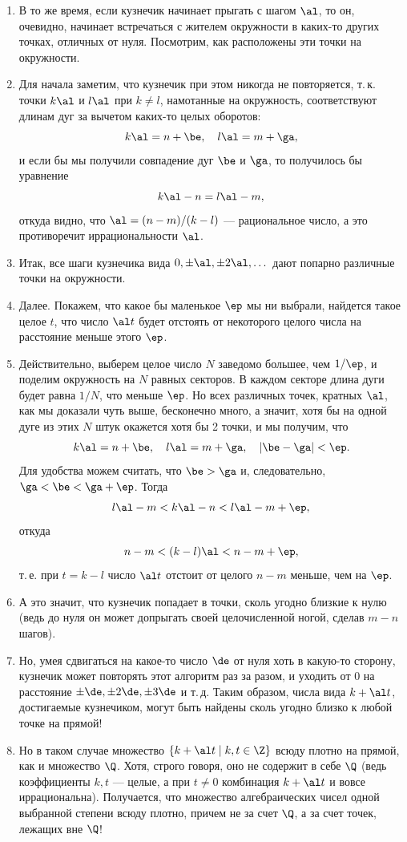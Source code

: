 \begin{enumerate}
\item В то же время, если кузнечик начинает прыгать с шагом $\al$, то он, очевидно, начинает встречаться с жителем окружности в каких-то других точках, отличных от нуля. Посмотрим, как расположены эти точки на окружности.
\item Для начала заметим, что кузнечик при этом никогда не повторяется, т.\,к. точки $k\al$ и $l\al$ при $k\ne l$, намотанные на окружность, соответствуют длинам дуг за вычетом каких-то целых оборотов:
$$
k\al = n + \be,\quad l\al=m+\ga,
$$
и если бы мы получили совпадение дуг $\be$ и $\ga$, то получилось бы уравнение
$$
k\al-n=l\al-m,
$$
откуда видно, что $\al=(n-m)/(k-l)$ --- рациональное число, а это противоречит иррациональности $\al$.
\item Итак, все шаги кузнечика вида $0,\pm\al,\pm 2\al,\dots$ дают попарно различные точки на окружности.
\item Далее. Покажем, что какое бы маленькое $\ep$ мы ни выбрали, найдется такое целое $t$, что число $\al t$ будет отстоять от некоторого целого числа на расстояние меньше этого $\ep$.
\item Действительно, выберем целое число $N$ заведомо большее, чем $1/\ep$, и поделим окружность на $N$ равных секторов. В каждом секторе длина дуги будет равна $1/N$, что меньше $\ep$. Но всех различных точек, кратных $\al$, как мы доказали чуть выше, бесконечно много, а значит, хотя бы на одной дуге из этих $N$ штук окажется хотя бы 2 точки, и мы получим, что
$$
k\al = n + \be,\quad l\al=m+\ga,\quad|\be-\ga|<\ep.
$$
Для удобства можем считать, что $\be>\ga$ и, следовательно, $\ga<\be<\ga+\ep$. Тогда
$$
l\al-m<k\al-n<l\al-m+\ep,
$$
откуда 
$$
n-m<(k-l)\al < n-m+\ep,
$$
т.\,е. при $t=k-l$ число $\al t$ отстоит от целого $n-m$ меньше, чем на $\ep$.
\item А это значит, что кузнечик попадает в точки, сколь угодно близкие к нулю (ведь до нуля он может допрыгать своей целочисленной ногой, сделав $m-n$ шагов).
\item Но, умея сдвигаться на какое-то число $\de$ от нуля хоть в какую-то сторону, кузнечик может повторять этот алгоритм раз за разом, и уходить от 0 на расстояние $\pm\de,\pm 2\de,\pm 3\de$ и т.\,д. Таким образом, числа вида $k+\al t$, достигаемые кузнечиком, могут быть найдены сколь угодно близко к любой точке на прямой!
\item Но в таком случае множество $\{k+\al t\mid k,t\in\Z\}$ всюду плотно на прямой, как и множество $\Q$. Хотя, строго говоря, оно не содержит в себе $\Q$ (ведь коэффициенты $k,t$ --- целые, а при $t\ne 0$ комбинация $k+\al t$ и вовсе иррациональна). Получается, что множество алгебраических чисел одной выбранной степени всюду плотно, причем не за счет $\Q$, а за счет точек, лежащих вне $\Q$!

\end{enumerate}
